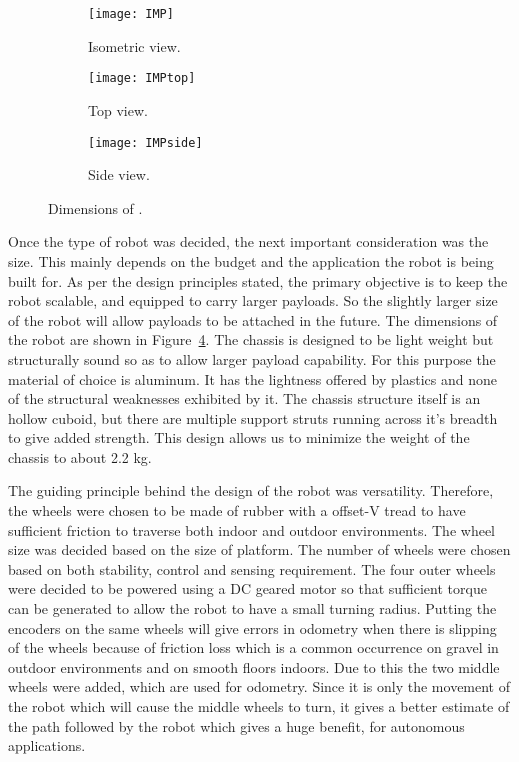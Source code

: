 \begin{figure}
    \centering
    \begin{subfigure}[b]{0.3\textwidth}
	    \texttt{[image: IMP]}
	    \caption{Isometric view.}
	    \label{fig:IMP}
    \end{subfigure}
    \quad %
    \begin{subfigure}[b]{0.3\textwidth}
        \texttt{[image: IMPtop]}
        \caption{Top view.}
        \label{fig:IMPtop}
    \end{subfigure}%
    \quad %
    \begin{subfigure}[b]{0.3\textwidth}
        \texttt{[image: IMPside]}
        \caption{Side view.}
        \label{fig:IMPside}
    \end{subfigure}%
    \caption{Dimensions of \imp.}
    \label{fig:IMPviews}
\end{figure}

Once the type of robot was decided, the next important consideration was the size. This mainly depends on the budget and the application the robot is being built for. As per the design principles stated, the primary objective is to keep the robot scalable, and equipped to carry larger payloads. So the slightly larger size of the robot will allow payloads to be attached in the future. The dimensions of the robot are shown in Figure~\ref{fig:IMPviews}. The chassis is designed to be light weight but structurally sound so as to allow larger payload capability. For this purpose the material of choice is aluminum. It has the lightness offered by plastics and none of the structural weaknesses exhibited by it. The chassis structure itself is an hollow cuboid, but there are multiple support struts running across it's breadth to give added strength. This design allows us to minimize the weight of the chassis to about 2.2 kg. 

The guiding principle behind the design of the robot was versatility. Therefore, the wheels were chosen to be made of rubber with a offset-V tread to have sufficient friction to traverse both indoor and outdoor environments. The wheel size was decided based on the size of platform. The number of wheels were chosen based on both stability, control and sensing requirement. The four outer wheels were decided to be powered using a DC geared motor so that sufficient torque can be generated to allow the robot to have a small turning radius. Putting the encoders on the same wheels will give errors in odometry when there is slipping of the wheels because of friction loss which is a common occurrence on gravel in outdoor environments and on smooth floors indoors. Due to this the two middle wheels were added, which are used for odometry. Since it is only the movement of the robot which will cause the middle wheels to turn, it gives a better estimate of the path followed by the robot which gives a huge benefit, for autonomous applications. 

